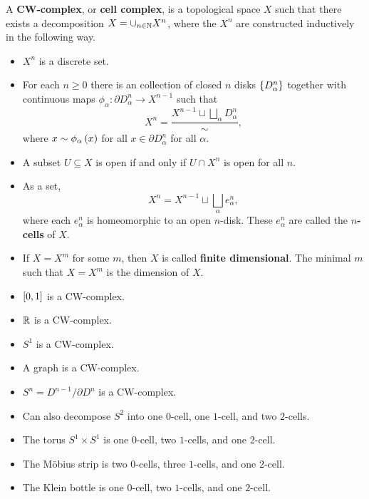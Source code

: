 \begin{definition}
A \textbf{CW-complex}, or \textbf{cell complex}, is a topological space $ X $ such that there exists a decomposition $ X = \cup_{n \in \N} X^n $, where the $ X^n $ are constructed inductively in the following way.
\begin{itemize}
\item $ X^n $ is a discrete set.
\item For each $ n \ge 0 $ there is an collection of closed $ n $ disks $ \cb{D_\alpha^n} $ together with continuous maps $ \phi_\alpha : \partial D_\alpha^n \to X^{n - 1} $ such that
$$ X^n = \dfrac{X^{n - 1} \sqcup \bigsqcup_\alpha D_\alpha^n}{\sim}, $$
where $ x \sim \phi_\alpha\rb{x} $ for all $ x \in \partial D_\alpha^n $ for all $ \alpha $.
\item A subset $ U \subseteq X $ is open if and only if $ U \cap X^n $ is open for all $ n $.
\end{itemize}
\end{definition}

\begin{remark1}
\hfill
\begin{itemize}
\item As a set,
$$ X^n = X^{n - 1} \sqcup \bigsqcup_\alpha e_\alpha^n, $$
where each $ e_\alpha^n $ is homeomorphic to an open $ n $-disk. These $ e_\alpha^n $ are called the \textbf{$ n $-cells} of $ X $.
\item If $ X = X^m $ for some $ m $, then $ X $ is called \textbf{finite dimensional}. The minimal $ m $ such that $ X = X^m $ is the dimension of $ X $.
\end{itemize}
\end{remark1}

\begin{example1}
\hfill
\begin{itemize}
\item $ \sb{0, 1} $ is a CW-complex.
\item $ \R $ is a CW-complex.
\item $ S^1 $ is a CW-complex.
\item A graph is a CW-complex.
\item $ S^n = D^{n - 1} / \partial D^n $ is a CW-complex.
\item Can also decompose $ S^2 $ into one $ 0 $-cell, one $ 1 $-cell, and two $ 2 $-cells.
\item The torus $ S^1 \times S^1 $ is one $ 0 $-cell, two $ 1 $-cells, and one $ 2 $-cell.
\item The M\"obius strip is two $ 0 $-cells, three $ 1 $-cells, and one $ 2 $-cell.
\item The Klein bottle is one $ 0 $-cell, two $ 1 $-cells, and one $ 2 $-cell.
\end{itemize}
\end{example1}

